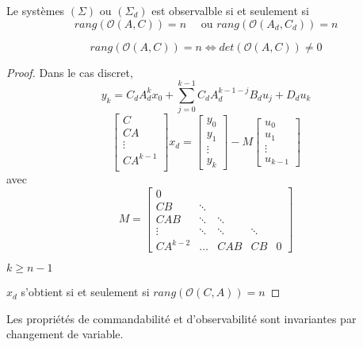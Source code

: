 \documentclass[main.tex]{subfiles}
\begin{document}
\begin{thm}
Le systèmes $(\Sigma)$ ou $(\Sigma_d)$ est observalble si et seulement si
\[ rang(\mathcal{O}(A,C)) = n \quad  \text{ ou }rang(\mathcal{O}(A_d,C_d)) = n \]
\end{thm}

\begin{prop}
\[rang(\mathcal{O}(A,C)) = n \Leftrightarrow det(\mathcal{O}(A,C)) \neq 0 \]
\end{prop}

\begin{proof}
Dans le cas discret, \[y_k = C_dA_d^kx_0 + \sum_{j=0}^{k-1}C_dA_d^{k-1-j}B_du_j+D_du_k\]
\[ \left[ \begin{array}{c} C \\ CA \\ \vdots \\CA^{k-1} \\ \end{array} \right] x_d = \left[ \begin{array}{c} y_0 \\ y_1 \\ \vdots \\ y_k \end{array} \right] - M \left[ \begin{array}{c} u_0 \\ u_1 \\ \vdots \\ u_{k-1} \end{array} \right] \]
avec \[ M = \left[
\begin{array}{ccccc}
0 \\
CB & \ddots\\
CAB & \ddots & \ddots \\
\vdots & \ddots & \ddots & \ddots \\
CA^{k-2} & \hdots & CAB & CB & 0
\end{array}
\right]
\]

$k\geq n-1$

$x_d$ s'obtient si et seulement si $rang(\mathcal{O}(C,A))=n$
\end{proof}



\begin{prop}
 Les propriétés de commandabilité et d'observabilité sont invariantes par changement de variable.
\end{prop}
\end{document}
